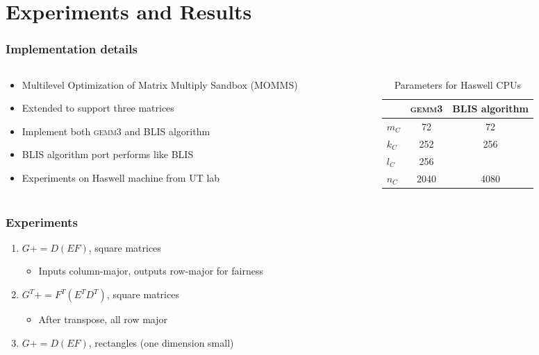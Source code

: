 \documentclass{beamer}
\newcommand*{\pluseq}{\mathrel{{+}{=}}}
\newcommand*{\gemmt}{{\textsc{gemm3}}}
\begin{document}
\section[Results]{Experiments and Results}
\frame{\sectionpage}

\begin{frame}
  \frametitle{Implementation details}
  \begin{columns}
    \begin{column}{0.5\textwidth}
      \begin{itemize}
      \item Multilevel Optimization of Matrix Multiply Sandbox (MOMMS)
      \item Extended to support three matrices
      \item Implement both \gemmt{} and BLIS algorithm
      \item BLIS algorithm port performs like BLIS
      \item Experiments on Haswell machine from UT lab
      \end{itemize}
    \end{column}
    \begin{column}{0.5\textwidth}
      \begin{table}
        \centering
        \begin{tabular}{l|c c}
          &\gemmt{}&BLIS algorithm\\ \hline
          $m_C$&72&72\\
          $k_C$&252&256\\
          $l_C$&256&\\
          $n_C$&2040&4080\\
        \end{tabular}
        \caption{Parameters for Haswell CPUs}
        \label{tab:haswell-paramss}
      \end{table}
    \end{column}
  \end{columns}
\end{frame}

\begin{frame}
  \frametitle{Experiments}
  \begin{enumerate}
  \item $G \pluseq D(EF)$, square matrices
    \begin{itemize}
    \item Inputs column-major, outputs row-major for fairness
    \end{itemize}
  \item $G^T \pluseq F^T(E^TD^T)$, square matrices
    \begin{itemize}
    \item After transpose, all row major
    \end{itemize}
  \item $G \pluseq D(EF)$, rectangles (one dimension small)
  \end{enumerate}
\end{frame}
\end{document}
